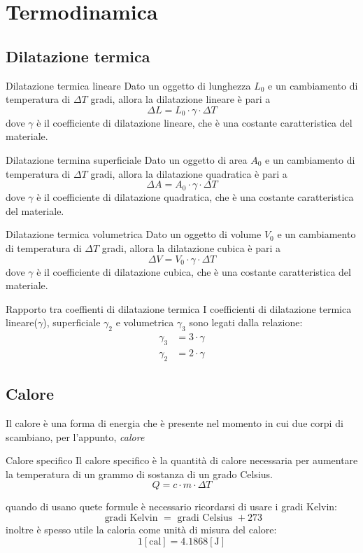 \section{Termodinamica}
\subsection{Dilatazione termica}
\begin{definizione}{Dilatazione termica lineare}
	Dato un oggetto di lunghezza $ L_0 $ e un cambiamento di temperatura di $ \Delta T $ gradi, allora la dilatazione lineare è pari a
	\[
		\Delta L = L_0 \cdot \gamma \cdot \Delta T
	\]
	dove $ \gamma $ è il coefficiente di dilatazione lineare, che è una costante caratteristica del materiale.
\end{definizione}
\begin{definizione}{Dilatazione termina superficiale}
	Dato un oggetto di area $ A_0 $ e un cambiamento di temperatura di $ \Delta T $ gradi, allora la dilatazione quadratica è pari a
	\[
		\Delta A = A_0 \cdot \gamma \cdot \Delta T
	\]
	dove $ \gamma $ è il coefficiente di dilatazione quadratica, che è una costante caratteristica del materiale.
\end{definizione}
\begin{definizione}{Dilatazione termica volumetrica}
	Dato un oggetto di volume $ V_0 $ e un cambiamento di temperatura di $ \Delta T $ gradi, allora la dilatazione cubica è pari a
	\[
		\Delta V = V_0 \cdot \gamma \cdot \Delta T
	\]
	dove $ \gamma $ è il coefficiente di dilatazione cubica, che è una costante caratteristica del materiale.
\end{definizione}

\begin{teorema}{Rapporto tra coeffienti di dilatazione termica}
	I coefficienti di dilatazione termica lineare($ \gamma $), superficiale $ \gamma_2 $ e volumetrica $ \gamma_3 $ sono legati dalla relazione:
	\begin{align*}
		\gamma_3 & = 3 \cdot \gamma \\
		\gamma_2 & = 2 \cdot \gamma
	\end{align*}
\end{teorema}

\subsection{Calore}
Il calore è una forma di energia che è presente nel momento in cui due corpi di scambiano, per l'appunto, \textit{calore}
\begin{definizione}{Calore specifico}
	Il calore specifico è la quantità di calore necessaria per aumentare la temperatura di un grammo di sostanza di un grado Celsius.
	\[
		Q = c \cdot m \cdot \Delta T
	\]
\end{definizione}
quando di usano quete formule è necessario ricordarsi di usare i gradi Kelvin:
\[
	\text{ gradi Kelvin } = \text{ gradi Celsius } + 273
\]
inoltre è spesso utile la caloria come unità di misura del calore:
\[
	1 \operatorname{[cal]} = 4.1868 \operatorname{[J]}
\]
